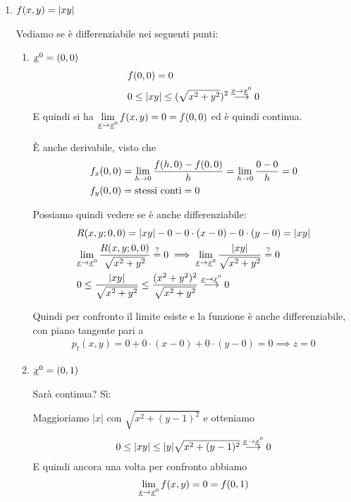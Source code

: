 \begin{enumerate}
	\item $f(x,y)=\left| xy \right|$
	
	Vediamo se è differenziabile nei seguenti punti:
	
	\begin{enumerate}
		\item $\underline{x}^0 = (0,0)$
		\begin{align}
		{}&f(0,0)=0 \\
		&0 \leq \left| xy \right| \leq (\sqrt{x^2 + y^2})^2 \overset{\underline{x} \rightarrow \underline{x}^0}{\longrightarrow} 0 
		\end{align}
		E quindi si ha $\underset{\underline{x} \rightarrow \underline{x}^0}{\lim} \, f(x,y)=0= f(0,0)$ ed è quindi continua.
		
		È anche derivabile, visto che
		\begin{align}
		{}&f_x(0,0) = \underset{h \rightarrow 0}{\lim} \, \frac{f(h,0) -f(0,0)}{h}=\underset{h \rightarrow 0}{\lim} \, \frac{0-0}{h}=0 \\
		&f_y(0,0)= \text{stessi conti} = 0
		\end{align}
	
		Possiamo quindi vedere se è anche differenziabile:
		\begin{align}
		{}& R(x,y;0,0)= \left| xy \right| -0 - 0 \cdot (x-0) - 0 \cdot (y-0)=\left| xy \right| \\
		& \underset{\underline{x} \rightarrow \underline{x}^0}{\lim} \,\frac{R(x,y;0,0)}{\sqrt{x^2 + y^2}} \overset{?}{=} 0 \implies \underset{\underline{x} \rightarrow \underline{x}^0}{\lim} \,\frac{\left| xy \right|}{\sqrt{x^2 + y^2}} \overset{?}{=} 0\\
		&0\leq  \frac{\left| xy \right|}{\sqrt{x^2 + y^2}} \leq \frac{(x^2 + y^2)^2}{\sqrt{x^2 + y^2}}\overset{\underline{x} \rightarrow \underline{x}^0}{\longrightarrow}0
		\end{align}
		
		Quindi per confronto il limite esiste e la funzione è anche differenziabile, con piano tangente pari a
		\begin{align}
		p_t(x,y)= 0 + 0 \cdot (x-0) + 0 \cdot (y-0)=0 \implies z=0 
		\end{align}
		
		\item $\underline{x}^0=(0,1)$
		
		Sarà continua? Sì: 
		
		Maggioriamo $|x|$ con $\sqrt{x^2 + (y-1)^2}$ e otteniamo
		\begin{align}
		0\leq \left| xy \right| \leq |y| \sqrt{x^2 + (y-1)^2} \overset{\underline{x} \rightarrow \underline{x}^0}{\longrightarrow} 0
		\end{align}
		E quindi ancora una volta per confronto abbiamo 
		\begin{align}
		\underset{\underline{x} \rightarrow \underline{x}^0}{\lim} \,f(x,y)=0= f(0,1)
		\end{align}
		

\end{enumerate}
\end{enumerate}
